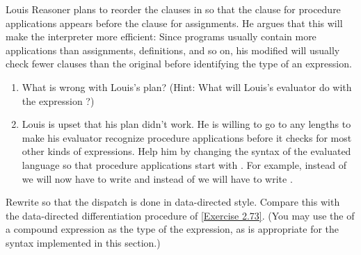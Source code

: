 \begin{exercise}
	\label{Exercise 4.2}
	Louis Reasoner plans to reorder the  clauses in  so that the clause for procedure applications appears before the clause for assignments.
	He argues that this will make the interpreter more efficient:
	Since programs usually contain more applications than assignments, definitions, and so on, his modified  will usually check fewer clauses than the original  before identifying the type of an expression.
	\begin{enumerate}[label=\alph*., leftmargin = *]

		\item
			What is wrong with Louis’s plan?
			(Hint: What will Louis’s evaluator do with the expression ?)

		\item
			Louis is upset that his plan didn’t work.
			He is willing to go to any lengths to make his evaluator recognize procedure applications before it checks for most other kinds of expressions.
			Help him by changing the syntax of the evaluated language so that procedure applications start with .
			For example, instead of  we will now have to write  and instead of  we will have to write .

	\end{enumerate}
\end{exercise}



\begin{exercise}
	\label{Exercise 4.3}
	Rewrite  so that the dispatch is done in data-directed style.
	Compare this with the data-directed differentiation procedure of \cref{Exercise 2.73}.
	(You may use the  of a compound expression as the type of the expression, as is appropriate for the syntax implemented in this section.)
\end{exercise}



